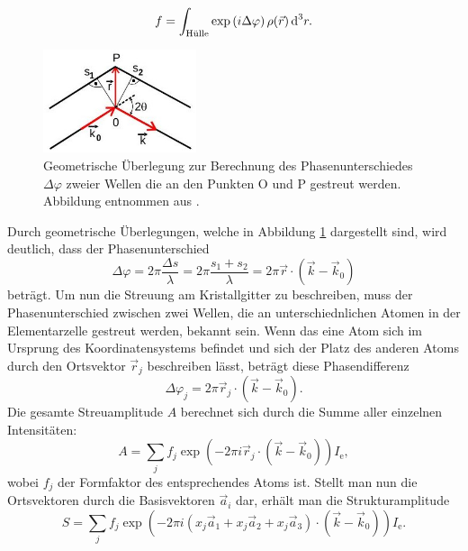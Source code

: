 \begin{equation}
  f=\int_\text{Hülle}\exp\left(i\Delta\varphi\right)\rho(\vec r)\,\text{d}^3r.
\end{equation}
\begin{figure}
\includegraphics[width=0.4\textwidth]{abb8.jpg}
\caption{Geometrische Überlegung zur Berechnung des Phasenunterschiedes $\Delta \varphi$ zweier Wellen die an den Punkten O und P gestreut werden. Abbildung entnommen aus \cite{V41}.}
\label{abb:8}
\end{figure}
Durch geometrische Überlegungen, welche in Abbildung \ref{abb:8} dargestellt sind, wird deutlich, dass der Phasenunterschied
\begin{equation}
  \label{eq:7}
  \Delta \varphi=2\pi \frac{\Delta s}{\lambda}=2\pi \frac{s_1+s_2}{\lambda}=2\pi\vec r \cdot \left(\vec k- \vec k_0\right)
\end{equation}
beträgt.
Um nun die Streuung am Kristallgitter zu beschreiben, muss  der Phasenunterschied zwischen zwei Wellen, die an unterschiednlichen Atomen in der Elementarzelle gestreut werden, bekannt sein.
Wenn das eine Atom sich im Ursprung des Koordinatensystems befindet und sich der Platz des anderen Atoms durch den Ortsvektor $\vec r_j$ beschreiben lässt, beträgt diese Phasendifferenz
\begin{equation}
  \Delta \varphi_j = 2\pi \vec r_j\cdot \left(\vec k-\vec k_0\right).
\end{equation}
Die gesamte Streuamplitude $A$ berechnet sich durch die Summe aller einzelnen Intensitäten:
\begin{equation}
  A=\sum_jf_j\exp\left(-2\pi i \vec r _j\cdot\left(\vec k-\vec k_0\right)\right)I_\text{e},
\end{equation}
wobei $f_j$ der Formfaktor des entsprechendes Atoms ist.
Stellt man nun die Ortsvektoren durch die Basisvektoren $\vec a_i$ dar, erhält man die Strukturamplitude
\begin{equation}
  S=\sum_jf_j\exp\left(-2\pi i \left(x_j\vec a_1+x_j\vec a_2+x_j\vec a_3 \right)\cdot\left(\vec k-\vec k_0\right)\right)I_\text{e}.
  \label{eq:streuamplitude}
\end{equation}
